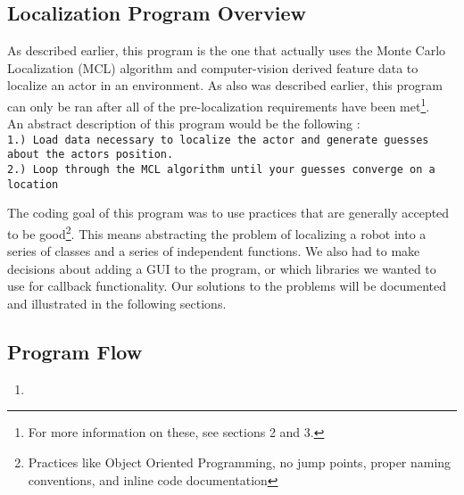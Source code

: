 \documentclass[a4paper,11pt]{article}
\begin{document}
  \subsection{Localization Program Overview}
  As described earlier, this program is the one that actually uses the Monte Carlo Localization (MCL) algorithm and computer-vision derived feature data to localize an actor in an environment.
  As also was described earlier, this program can only be ran after all of the pre-localization requirements have been met\footnote{For more information on these, see sections 2 and 3.}.
  \\ An abstract description of this program would be the following :
  \\ \texttt{1.) Load data necessary to localize the actor and generate guesses about the actors position.} 
  \\ \texttt{2.) Loop through the MCL algorithm until your guesses converge on a location}

  The coding goal of this program was to use practices that are generally accepted to be good\footnote{Practices like Object Oriented Programming, no jump points, proper naming conventions, and inline code documentation}.
  This means abstracting the problem of localizing a robot into a series of classes and a series of independent functions. We also had to make decisions about adding a GUI
  to the program, or which libraries we wanted to use for callback functionality. Our solutions to the problems will be documented and illustrated in the following sections.
  
  \subsection{Program Flow}
  \begin{enumerate}
   \item
  \end{enumerate}


\end{document}
